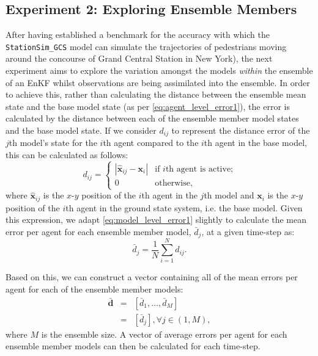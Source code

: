 \documentclass{article}
\begin{document}
\subsection{Experiment 2: Exploring Ensemble Members}


After having established a benchmark for the accuracy with which the \texttt{StationSim\_GCS} model can simulate the trajectories of pedestrians moving around the concourse of Grand Central Station in New York), the next experiment aims to explore the variation amongst the models \textit{within} the ensemble of an EnKF whilst observations are being assimilated into the ensemble.  
In order to achieve this, rather than calculating the distance between the ensemble mean state and the base model state (as per \eqref{eq:agent_level_error1}), the error is calculated by the distance between each of the ensemble member model states and the base model state.  If we consider $d_{ij}$ to represent the distance error of the $j$th model's state for the $i$th agent compared to the $i$th agent in the base model, this can be calculated as follows:
\begin{equation}
	d_{ij} = 
	\begin{cases}
		| \hat{\mathbf{x}}_{ij} - \mathbf{x}_i | & \text{if $i$th agent is
			active;}\\
		0 & \text{otherwise,}
	\end{cases}
    \label{eq:agentl_level_error2}
\end{equation}
where $\hat{\mathbf{x}}_{ij}$ is the $x$-$y$ position of the $i$th agent in the $j$th model and $\mathbf{x}_i$ is the $x$-$y$ position of the $i$th agent in the ground state system, i.e. the base model. Given this expression, we adapt \eqref{eq:model_level_error1} slightly to calculate the mean error per agent for each ensemble member model, $\bar{d}_j$, at a given time-step as:
\begin{equation}
	\bar{d}_j = \frac{1}{N} \sum_{i=1}^{N} d_{ij} .
    \label{eq:model_level_error2}
\end{equation}

Based on this, we can construct a vector containing all of the mean errors per agent for each of the ensemble member models:
\begin{eqnarray}
	\bar{\mathbf{d}} &=& \left[ \bar{d}_1, \ldots, \bar{d}_M \right] \\
	&=& \left[ \bar{d}_j  \right], \forall j \in (1, M),
\end{eqnarray}
where $M$ is the ensemble size.
A vector of average errors per agent for each ensemble member models can then be calculated for each time-step.
\end{document}
